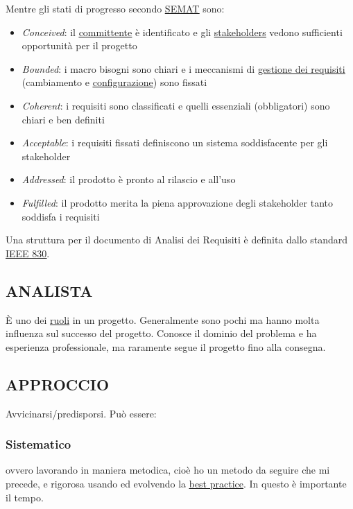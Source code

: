 		Mentre gli stati di progresso secondo \underline{\hyperref[semat]{SEMAT}} sono:
			\begin{itemize}
				\item \textit{Conceived}: il \underline{\hyperref[committente]{committente}} è identificato e gli \underline{\hyperref[stakeholder]{stakeholders}} vedono sufficienti opportunità per il progetto
				\item \textit{Bounded}:
				i macro bisogni sono chiari e i meccanismi di
				\underline{\hyperref[gestionerequisiti]{gestione dei requisiti}}
				(cambiamento e \underline{\hyperref[configurazione]{configurazione}}) sono fissati
				\item \textit{Coherent}: i requisiti sono classificati e quelli essenziali (obbligatori) sono chiari e ben definiti
				\item \textit{Acceptable}: i requisiti fissati definiscono un sistema soddisfacente per gli stakeholder
				\item \textit{Addressed}: il prodotto è pronto al rilascio e all'uso
				\item \textit{Fulfilled}: il prodotto merita la piena approvazione degli stakeholder tanto soddisfa i requisiti
			\end{itemize}
		Una struttura per il documento di Analisi dei Requisiti è definita dallo standard \underline{\hyperref[ieee830]{IEEE 830}}.



		\subsection{ANALISTA}  \label{analista}
		È uno dei \underline{\hyperref[ruoli]{ruoli}} in un progetto. Generalmente sono pochi ma hanno molta influenza sul successo del progetto. Conosce il dominio del problema e ha esperienza professionale, ma raramente segue il progetto fino alla consegna.

		\subsection{APPROCCIO} \label{approccio} 
		Avvicinarsi/predisporsi. Può essere:
			\subsubsection{Sistematico} \label{sistematico}
			ovvero lavorando in maniera metodica, cioè ho un metodo da seguire che mi precede, e rigorosa usando ed evolvendo la \underline{\hyperref[best]{best practice}}.
			In questo è importante il tempo.
